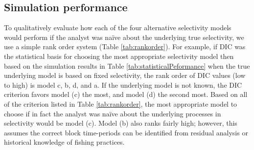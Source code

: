 


\subsection*{Simulation performance} %
\label{sub:simulation_performance}




To qualitatively evaluate how each of the four alternative selectivity models would perform if the analyst was na\"ive about the underlying true selectivity, we use a simple rank order system (Table \ref{tab:rankorder}).  For example, if DIC was the statistical basis for choosing the most appropriate selectivity model then based on the simulation results in Table \ref{tab:statisticalPeformance} when the true underlying model is based on fixed selectivity, the rank order of DIC values (low to high) is model c, b, d, and a. If the underlying model is not known, the DIC criterion favors model (c) the most, and model (d) the second most.    Based on all of the criterion listed in Table \ref{tab:rankorder}, the most appropriate model to choose if in fact the analyst was na\"ive about the underlying processes in selectivity would be model (c).    Model (b) also ranks fairly high; however, this assumes the correct block time-periods can be identified from residual analysis or historical knowledge of fishing practices.


